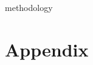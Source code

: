 \documentclass[runningheads]{template/llncs}
\begin{document}






	{methodology}

	
	

	\newpage

	\appendix

	\section{Appendix}
	\label{app:hyperparameters}
\end{document}
